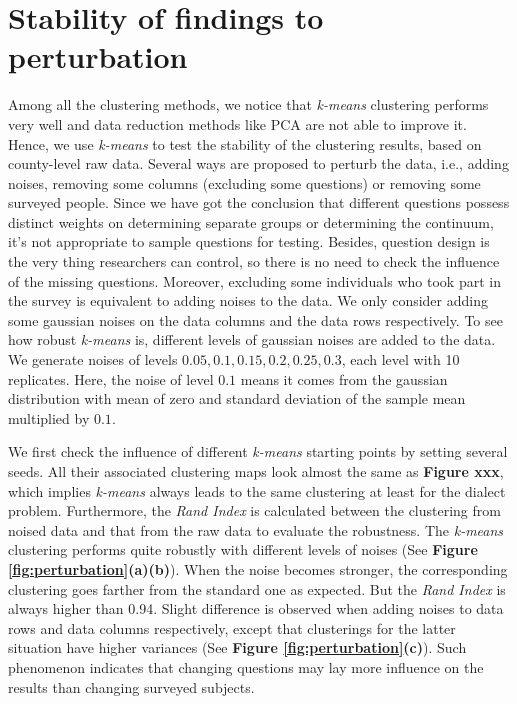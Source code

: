 \section{Stability of findings to perturbation}
\label{sec:stability}

\qquad Among all the clustering methods, we notice that \textit{k-means} clustering performs very well and data reduction methods like PCA are not able to improve it. Hence, we use \textit{k-means} to test the stability of the clustering results, based on county-level raw data. Several ways are proposed to perturb the data, i.e., adding noises, removing some columns (excluding some questions) or removing some surveyed people. Since we have got the conclusion that different questions possess distinct weights on determining separate groups or determining the continuum, it's not appropriate to sample questions for testing.  Besides, question design is the very thing researchers can control, so there is no need to check the influence of the missing questions. Moreover, excluding some individuals who took part in the survey is equivalent to adding noises to the data. We only consider adding some gaussian noises on the data columns and the data rows respectively. To see how robust \textit{k-means} is,  different levels of gaussian noises are added to the data. We generate noises of levels $0.05, 0.1, 0.15, 0.2, 0.25, 0.3$, each level with 10 replicates. Here, the noise of level $0.1$ means it comes from the gaussian distribution with mean of zero and standard deviation of  the sample mean multiplied by $0.1$. 

\qquad  We first check the influence of different \textit{k-means} starting points by setting several seeds. All their associated clustering maps look almost the same as \textbf{Figure xxx}, which implies \textit{k-means} always leads to the same clustering at least for the dialect problem. Furthermore, the \textit{Rand Index} is calculated between the clustering from noised data and that from the raw data to evaluate the robustness. The \textit{k-means} clustering performs quite robustly with different levels of noises (See \textbf{Figure \ref{fig:perturbation}(a)(b)}). When the noise becomes stronger, the corresponding clustering goes farther from the standard one as expected. But the \textit{Rand Index} is always higher than 0.94. Slight difference is observed when adding noises to data rows and data columns respectively, except that clusterings for the latter situation have higher variances (See \textbf{Figure \ref{fig:perturbation}(c)}). Such phenomenon indicates that changing questions may lay more influence on the results than changing surveyed subjects.

